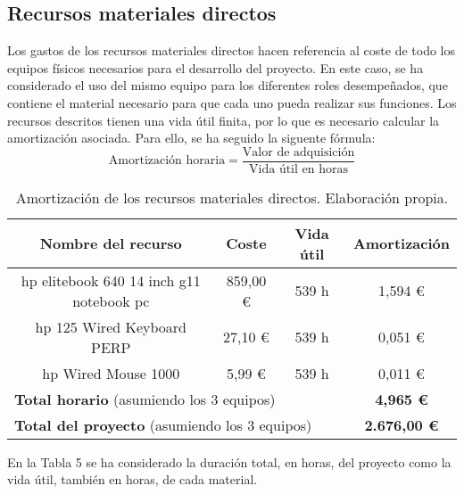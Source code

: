 \subsection{Recursos materiales directos}
Los gastos de los recursos materiales directos hacen referencia al coste de todo los equipos físicos necesarios para el desarrollo del proyecto.
En este caso, se ha considerado el uso del mismo equipo para los diferentes roles desempeñados, que contiene el material 
necesario para que cada uno pueda realizar sus funciones. Los recursos descritos tienen una vida útil finita, por lo que es necesario
calcular la amortización asociada. Para ello, se ha seguido la siguente fórmula:   
\begin{equation}
    \text{Amortización horaria} = \frac{\text{Valor de adquisición}}{\text{Vida útil en horas}}
\end{equation}


\begin{table}[H]
    \centering
    \begin{tabular}{|c|c|c|c|}
        \hline
        \textbf{Nombre del recurso} & \textbf{Coste} & \textbf{Vida útil} & \textbf{Amortización}\\
        \hline
        hp elitebook 640 14 inch g11 notebook pc & 859,00 € & 539 h & 1,594 € \\
        hp 125 Wired Keyboard PERP & 27,10 € & 539 h & 0,051 € \\
        hp Wired Mouse 1000 & 5,99 € & 539 h &  0,011 €\\
        \hline
        \multicolumn{3}{|l|}{\textbf{Total horario} (asumiendo los 3 equipos)}  & \textbf{4,965 €} \\
        \hline
        \multicolumn{3}{|l|}{\textbf{Total del proyecto} (asumiendo los 3 equipos)}  & \textbf{2.676,00 €} \\
        \hline
    \end{tabular}
    \caption{Amortización de los recursos materiales directos. Elaboración propia.}
    \label{tab:recursos_directos}
\end{table}


En la Tabla 5 se ha considerado la duración total, en horas, del proyecto como la vida útil,
también en horas, de cada material.
